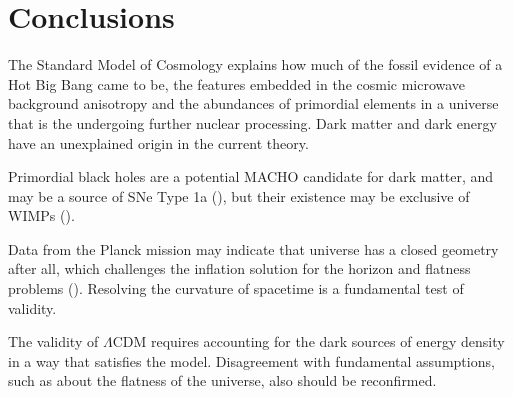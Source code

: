 \documentclass{paper}
\begin{document}
\section{Conclusions}
  The Standard Model of Cosmology explains how much of the fossil evidence
  of a Hot Big Bang came to be, the features embedded in the cosmic microwave 
  background anisotropy and the abundances of primordial elements in a 
  universe that is the undergoing further nuclear processing. Dark matter
  and dark energy have an unexplained origin in the current theory.

  Primordial black holes are a potential MACHO candidate for dark matter, 
  and may be a source of SNe Type 1a (\cite{PhysRevD.92.063007}), but their
  existence may be exclusive of WIMPs (\cite{Adamek_2019}). 

  Data from the Planck mission may indicate that universe has a closed 
  geometry after all, which challenges the inflation solution for the horizon
  and flatness problems (\cite{2020NatAs...4..196D}). Resolving the 
  curvature of spacetime is a fundamental test of validity.

  The validity of $\Lambda$CDM requires accounting for the dark sources of
  energy density in a way that satisfies the model. Disagreement with
  fundamental assumptions, such as about the flatness of the universe,
  also should be reconfirmed.




\pagebreak
\begin{singlespace}
\printbibliography
\end{singlespace}

\end{document}
